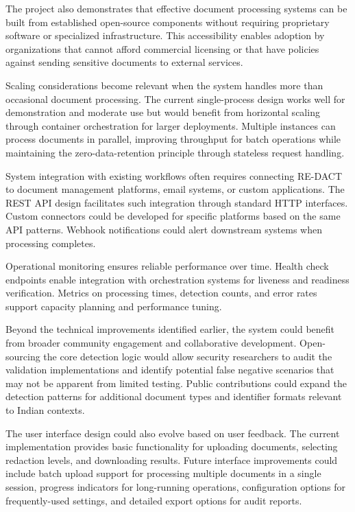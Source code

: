 The project also demonstrates that effective document processing systems can be built from established open-source components without requiring proprietary software or specialized infrastructure. This accessibility enables adoption by organizations that cannot afford commercial licensing or that have policies against sending sensitive documents to external services.

\bigskip

Scaling considerations become relevant when the system handles more than occasional document processing. The current single-process design works well for demonstration and moderate use but would benefit from horizontal scaling through container orchestration for larger deployments. Multiple instances can process documents in parallel, improving throughput for batch operations while maintaining the zero-data-retention principle through stateless request handling.

System integration with existing workflows often requires connecting RE-DACT to document management platforms, email systems, or custom applications. The REST API design facilitates such integration through standard HTTP interfaces. Custom connectors could be developed for specific platforms based on the same API patterns. Webhook notifications could alert downstream systems when processing completes.

Operational monitoring ensures reliable performance over time. Health check endpoints enable integration with orchestration systems for liveness and readiness verification. Metrics on processing times, detection counts, and error rates support capacity planning and performance tuning.

\bigskip

Beyond the technical improvements identified earlier, the system could benefit from broader community engagement and collaborative development. Open-sourcing the core detection logic would allow security researchers to audit the validation implementations and identify potential false negative scenarios that may not be apparent from limited testing. Public contributions could expand the detection patterns for additional document types and identifier formats relevant to Indian contexts.

The user interface design could also evolve based on user feedback. The current implementation provides basic functionality for uploading documents, selecting redaction levels, and downloading results. Future interface improvements could include batch upload support for processing multiple documents in a single session, progress indicators for long-running operations, configuration options for frequently-used settings, and detailed export options for audit reports.

